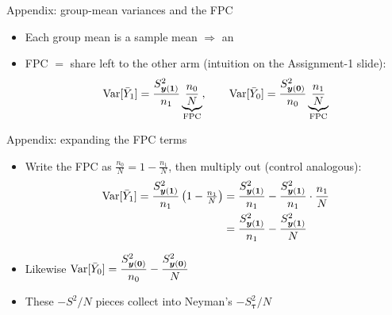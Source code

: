 \documentclass[table, xcolor = {dvipsnames}, 9pt]{beamer}
\theoremstyle{plain}
\newcommand{\mh}[1]{{\color{magenta}{#1}}}
\DeclareMathOperator{\Var}{\rm{Var}}
\begin{document}
\begin{frame}[t]{Appendix: group-mean variances and the FPC}
\vfill
\begin{itemize} \vfill
\item Each group mean is a \mh{without-replacement} sample mean $\Rightarrow$ an \mh{FPC} \vfill
\item[] FPC $=$ share left to the other arm (intuition on the Assignment-1 slide):
\begin{equation*}
\Var[\bar{Y}_1] = \frac{S^2_{\bm{y}(\bm{1})}}{n_1}\underbrace{\frac{n_0}{N}}_{\text{FPC}}, \qquad
\Var[\bar{Y}_0] = \frac{S^2_{\bm{y}(\bm{0})}}{n_0}\underbrace{\frac{n_1}{N}}_{\text{FPC}}
\end{equation*}
\end{itemize}
\vfill
\end{frame}
\begin{frame}[t]{Appendix: expanding the FPC terms}
\vfill
\begin{itemize} \vfill
\item Write the FPC as $\tfrac{n_0}{N} = 1 - \tfrac{n_1}{N}$, then multiply out (control analogous): \vfill 
\begin{align*}
\Var[\bar{Y}_1] = \frac{S^2_{\bm{y}(\bm{1})}}{n_1}\left(1 - \tfrac{n_1}{N}\right)
&= \frac{S^2_{\bm{y}(\bm{1})}}{n_1} - \frac{S^2_{\bm{y}(\bm{1})}}{n_1}\cdot\frac{n_1}{N} \\
&= \frac{S^2_{\bm{y}(\bm{1})}}{n_1} - \frac{S^2_{\bm{y}(\bm{1})}}{N}
\end{align*} \vfill
\item[] Likewise $\Var[\bar{Y}_0] = \dfrac{S^2_{\bm{y}(\bm{0})}}{n_0} - \dfrac{S^2_{\bm{y}(\bm{0})}}{N}$ \vfill
\item These $-S^2/N$ pieces collect into Neyman's $-S^2_{\bm{\tau}}/N$ \vfill
\end{itemize} \vfill
\end{frame}
\end{document}
